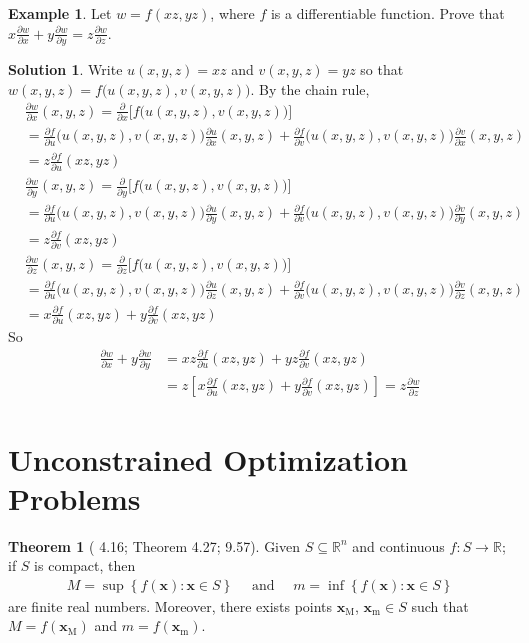 \documentclass[10pt]{extarticle}
\newcommand{\ds}{\displaystyle}
\theoremstyle{definition}
\newtheorem*{thm}{Theorem}
\newtheorem*{ex}{Example}
\newtheorem*{sol}{Solution}
\newcommand{\vx}{\mathbf{x}}
\newcommand{\pdiff}[2]{\frac{\partial #1}{\partial #2}}
\begin{document}
\newpage

\begin{ex}
  Let $w = f(x z, y z)$, where $f$ is a differentiable function. Prove that $\ds x\frac{\partial w}{\partial x} + y\frac{\partial w}{\partial y} = z\frac{\partial w}{\partial z}$.
\end{ex}

\begin{sol}
  Write $u(x,y,z)=xz$ and $v(x,y,z)=yz$ so that $w(x,y,z) = f\big(u(x,y,z), v(x,y,z)\big)$. By the chain rule,
  \begin{align*}
    &\pdiff{w}{x}(x,y,z) = \pdiff{}{x}\big[f \big(u(x,y,z), v(x,y,z)\big)\big] \\
    &= \pdiff{f}{u}\big(u(x,y,z), v(x,y,z)\big)\pdiff{u}{x}(x,y,z) + \pdiff{f}{v}\big(u(x,y,z), v(x,y,z)\big)\pdiff{v}{x}(x,y,z) \\ 
    &= z\pdiff{f}{u}(xz, yz)
  \end{align*}
  \begin{align*}
    &\pdiff{w}{y}(x,y,z) = \pdiff{}{y}\big[f \big(u(x,y,z), v(x,y,z)\big)\big] \\
    &= \pdiff{f}{u}\big(u(x,y,z), v(x,y,z)\big)\pdiff{u}{y}(x,y,z) + \pdiff{f}{v}\big(u(x,y,z), v(x,y,z)\big)\pdiff{v}{y}(x,y,z) \\
    &= z\pdiff{f}{v}(xz, yz)
  \end{align*}
  \begin{align*}
    &\pdiff{w}{z}(x,y,z) = \pdiff{}{z}\big[f \big(u(x,y,z), v(x,y,z)\big)\big] \\
    &= \pdiff{f}{u}\big(u(x,y,z), v(x,y,z)\big)\pdiff{u}{z}(x,y,z) + \pdiff{f}{v}\big(u(x,y,z), v(x,y,z)\big)\pdiff{v}{z}(x,y,z) \\
    &= x\pdiff{f}{u}(xz, yz) + y\pdiff{f}{v}(xz, yz)
  \end{align*}
  So
  \begin{align*}
    \pdiff{w}{x} + y\pdiff{w}{y} &= xz\pdiff{f}{u}(xz, yz) + yz\pdiff{f}{v}(xz, yz) \\&= z\left[x\pdiff{f}{u}(xz, yz) + y\pdiff{f}{v}(xz, yz)\right] = z\pdiff{w}{z}
  \end{align*}
\end{sol}

\newpage
\section*{Unconstrained Optimization Problems}

\begin{thm}[\citet{rudin} 4.16; \citet{apostol_adv} Theorem 4.27; \citet{wade} 9.57]
  Given $\ds S\subseteq\mathbb{R}^n$ and continuous $f: S\to\mathbb{R}$; if $S$ is compact, then  
  \begin{align*}
    M = \sup\left\{f(\vx): \vx\in S\right\}\quad\text{ and }\quad m = \inf\left\{f(\vx): \vx\in S\right\}
  \end{align*}
  are finite real numbers. Moreover, there exists points $\vx_\text{M}$, $\vx_\text{m}\in S$ such that $M = f(\vx_\text{M})$ and $m = f(\vx_\text{m})$.
\end{thm}
\end{document}
